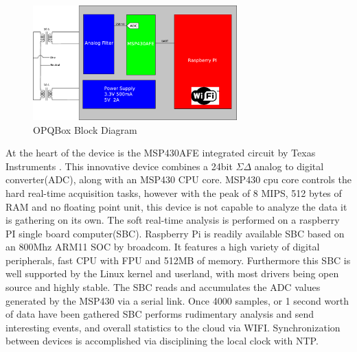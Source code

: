 \begin{figure}[h!]
\centering
\includegraphics[width=0.7\textwidth]{img/OHM1Block.eps}
\caption{OPQBox Block Diagram}
\end{figure}

	At the heart of the device is the MSP430AFE integrated circuit by Texas Instruments \textregistered. This innovative device combines a 24bit $\Sigma\Delta$ analog to digital converter(ADC),
along with an MSP430 CPU core. MSP430 cpu core controls the hard real-time acquisition tasks, however with the peak of 8 MIPS, 512 bytes of RAM and no floating point unit, this device is not
capable to analyze the data it is gathering on its own. The soft real-time analysis is performed on a raspberry PI single board computer(SBC). Raspberry Pi is readily available SBC based on an 800Mhz
ARM11 SOC by broadcom. It features a high variety of digital peripherals, fast CPU with FPU and 512MB of memory. Furthermore this SBC is well supported by the Linux kernel and userland, 
with most drivers being open source and highly stable. The SBC reads and accumulates the ADC values generated by the MSP430 via a serial link. Once 4000 samples, or 1 second worth of data
have been gathered SBC performs rudimentary analysis and send interesting events, and overall statistics to the cloud via WIFI. Synchronization between devices is accomplished via disciplining the 
local clock with NTP.

